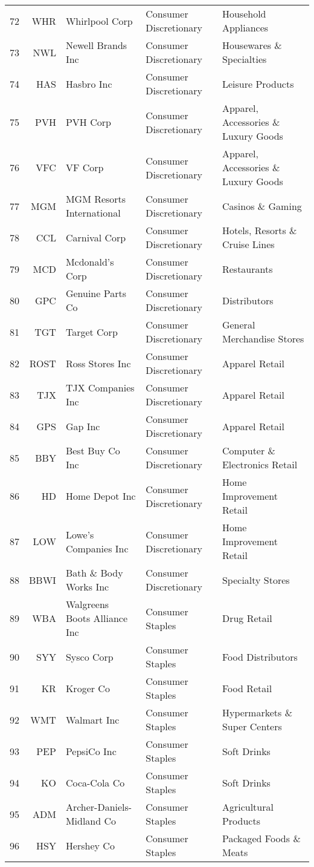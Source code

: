 \documentclass[aps, pra, groupedaddress, showkeys, twocolumn, floatfix, 10pt]{revtex4-2}
\begin{document}
{\begin{longtable}{rrllp{4cm}}
72&WHR&Whirlpool Corp&Consumer Discretionary&Household Appliances \\
73&NWL&Newell Brands Inc&Consumer Discretionary&Housewares \& Specialties \\
74&HAS&Hasbro Inc&Consumer Discretionary&Leisure Products \\
75&PVH&PVH Corp&Consumer Discretionary&Apparel, Accessories \& Luxury Goods \\
76&VFC&VF Corp&Consumer Discretionary&Apparel, Accessories \& Luxury Goods \\
77&MGM&MGM Resorts International&Consumer Discretionary&Casinos \& Gaming \\
78&CCL&Carnival Corp&Consumer Discretionary&Hotels, Resorts \& Cruise Lines \\
79&MCD&Mcdonald's Corp&Consumer Discretionary&Restaurants \\
80&GPC&Genuine Parts Co&Consumer Discretionary&Distributors \\
81&TGT&Target Corp&Consumer Discretionary&General Merchandise Stores \\
82&ROST&Ross Stores Inc&Consumer Discretionary&Apparel Retail \\
83&TJX&TJX Companies Inc&Consumer Discretionary&Apparel Retail \\
84&GPS&Gap Inc&Consumer Discretionary&Apparel Retail \\
85&BBY&Best Buy Co Inc&Consumer Discretionary&Computer \& Electronics Retail \\
86&HD&Home Depot Inc&Consumer Discretionary&Home Improvement Retail \\
87&LOW&Lowe's Companies Inc&Consumer Discretionary&Home Improvement Retail \\
88&BBWI&Bath \& Body Works Inc&Consumer Discretionary&Specialty Stores \\
89&WBA&Walgreens Boots Alliance Inc&Consumer Staples&Drug Retail \\
90&SYY&Sysco Corp&Consumer Staples&Food Distributors \\
91&KR&Kroger Co&Consumer Staples&Food Retail \\
92&WMT&Walmart Inc&Consumer Staples&Hypermarkets \& Super Centers \\
93&PEP&PepsiCo Inc&Consumer Staples&Soft Drinks \\
94&KO&Coca-Cola Co&Consumer Staples&Soft Drinks \\
95&ADM&Archer-Daniels-Midland Co&Consumer Staples&Agricultural Products \\
96&HSY&Hershey Co&Consumer Staples&Packaged Foods \& Meats \\

\end{longtable}}
\end{document}
